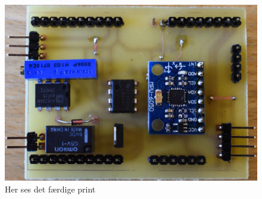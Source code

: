 \begin{figure}[h!b]
	\centering
		\includegraphics[scale=0.04]{Billeder/Print-top.JPG}
	\caption{Her ses det færdige print}
	\label{fig:Print}
\end{figure}
